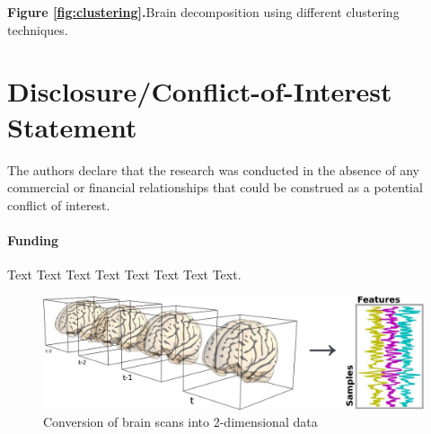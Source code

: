 \documentclass{frontiersSCNS} %
\begin{document}
\textbf{Figure \ref{fig:clustering}.}{Brain decomposition using different clustering techniques.}\label{fig:04}


\section*{Disclosure/Conflict-of-Interest Statement}
The authors declare that the research was conducted in the absence of any
commercial or financial relationships that could be construed as a potential
conflict of interest.

\paragraph{Funding\textcolon} Text Text Text Text Text Text  Text Text.



\newpage

\begin{figure}[h]
    \includegraphics[width=.5\linewidth]{img/niimgs.jpg}
    \caption{Conversion of brain scans into 2-dimensional data}
    \label{fig:niimg}
\end{figure}
\end{document}
